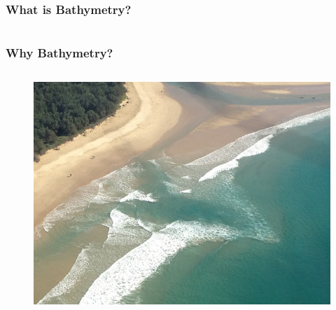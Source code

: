 \documentclass[7pt]{beamer}
\begin{document}
\begin{frame}
\frametitle{What is Bathymetry?}
\begin{columns}



\end{columns}

\end{frame}
\begin{frame}
\frametitle{Why Bathymetry?}
\begin{columns}

\begin{figure}[h!]
\includegraphics[width=.80\linewidth]{img/Rip_C.jpg}\hfill
\end{figure}


\end{columns}
\end{frame}
\end{document}
